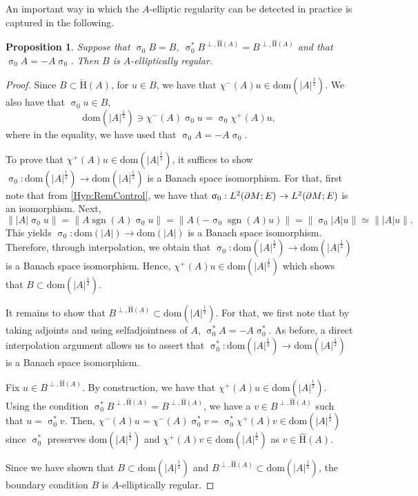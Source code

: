 \documentclass[a4paper,10pt,reqno]{amsart}
\newcommand{\sym}{\upsigma}
\newcommand{\modulus}[1]{|#1|}
\newcommand{\norm}[1]{\| #1 \|}%
\newcommand{\Lp}[2][{}]{{\rm L}^{#2}_{\rm #1}}%
\newcommand{\checkH}{\check{\mathrm{H}}}
\newcommand{\hatH}{\hat{\mathrm{H}}}
\newcommand{\dom}{\mathrm{dom}}
\DeclareMathOperator{\sgn}{sgn}%
\newcommand{\dM}{\partial M}
\newtheorem{proposition}[theorem]{Proposition}
\theoremstyle{definition}
\begin{document}
An important way in which the $A$-elliptic regularity can be detected in practice is captured in the following.
\begin{proposition}
\label{Prop:ProjBCAReg}
Suppose that $\sym_0B = B$, $\sym_0^\ast B^{\perp, \hatH(A)} = B^{\perp, \hatH(A)}$ and that $\sym_0 A = - A \sym_0$.
Then $B$ is $A$-elliptically regular.
\end{proposition}
\begin{proof}
Since $B \subset \checkH(A)$, for $u \in B$, we have that $\chi^-(A)u \in \dom(\modulus{A}^{\frac12})$.
We also have that $\sym_0 u \in B$,
$$\dom(\modulus{A}^{\frac12}) \ni \chi^-(A)\sym_0u = \sym_0 \chi^+(A) u,$$
where in the equality, we have used that $\sym_0 A = - A \sym_0$.

To prove that $\chi^+(A)u \in \dom(\modulus{A}^{\frac12})$, it suffices to show  $\sym_0: \dom(\modulus{A}^{\frac12}) \to \dom(\modulus{A}^{\frac12})$ is a Banach space isomorphism.
For that, first note that from \ref{Hyp:RemControl}, we have that $\sym_0: \Lp{2}(\dM;E) \to \Lp{2}(\dM;E)$ is an isomorphism.
Next,
$$ \norm{\modulus{A} \sym_0u } = \norm{A\sgn(A)\sym_0 u} = \norm{A (- \sym_0 \sgn(A) u)} = \norm{\sym_0 \modulus{A}u} \simeq \norm{\modulus{A}u}.$$
This yields $\sym_0: \dom(\modulus{A}) \to \dom(\modulus{A})$ is a Banach space isomorphism.
Therefore, through interpolation, we obtain that $\sym_0: \dom(\modulus{A}^{\frac12}) \to \dom(\modulus{A}^{\frac12})$ is a Banach space isomorphism.
Hence, $\chi^+(A)u \in \dom(\modulus{A}^{\frac12})$ which shows that $B \subset \dom(\modulus{A}^{\frac12})$.

It remains to show that $B^{\perp, \hatH(A)} \subset \dom(\modulus{A}^{\frac12})$.
For that, we first note that by taking adjoints and using selfadjointness of $A$, $\sym_0^\ast A = - A \sym_0^\ast$.
As before, a direct interpolation argument allows us to assert that $\sym_0^\ast: \dom(\modulus{A}^{\frac12}) \to \dom(\modulus{A}^{\frac12})$ is a Banach space isomorphism.

Fix $u \in B^{\perp, \hatH(A)}$.
By construction, we have that $\chi^+(A)u \in \dom(\modulus{A}^{\frac12})$.
Using the condition $\sym_0^\ast B^{\perp, \hatH(A)} = B^{\perp, \hatH(A)}$, we have a $v \in B^{\perp ,\hatH(A)}$ such that $u = \sym_0^\ast v$.
Then, $\chi^-(A) u = \chi^-(A)\sym_0^\ast v = \sym_0^\ast \chi^+(A)v \in \dom(\modulus{A}^{\frac12})$ since $\sym_0^\ast$ preserves $\dom(\modulus{A}^{\frac12})$ and $\chi^+(A) v \in \dom(\modulus{A}^{\frac12})$ as $v \in \hatH(A)$.

Since we have shown that $B \subset \dom(\modulus{A}^{\frac12})$ and $B^{\perp, \hatH(A)} \subset \dom(\modulus{A}^{\frac12})$, the boundary condition $B$ is $A$-elliptically regular.
\end{proof}
\end{document}
